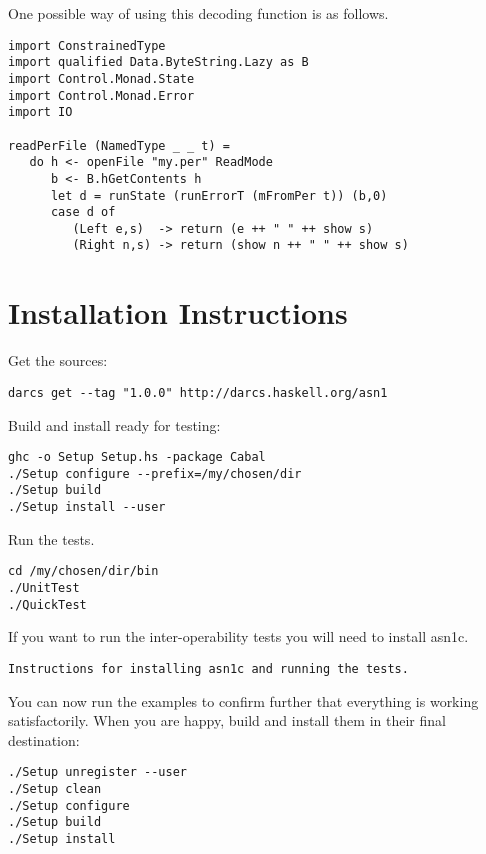\documentclass{article}
\begin{document}
One possible way of using this decoding function is as follows.

\begin{lstlisting}[frame=single]
import ConstrainedType
import qualified Data.ByteString.Lazy as B
import Control.Monad.State
import Control.Monad.Error
import IO

readPerFile (NamedType _ _ t) =
   do h <- openFile "my.per" ReadMode
      b <- B.hGetContents h
      let d = runState (runErrorT (mFromPer t)) (b,0)
      case d of
         (Left e,s)  -> return (e ++ " " ++ show s)
         (Right n,s) -> return (show n ++ " " ++ show s)
\end{lstlisting}

\section{Installation Instructions}

Get the sources:

\lstset{language=shell,basicstyle=\ttfamily\small}
\begin{lstlisting}[frame=single]
darcs get --tag "1.0.0" http://darcs.haskell.org/asn1
\end{lstlisting}

Build and install ready for testing:

\begin{lstlisting}[frame=single]
ghc -o Setup Setup.hs -package Cabal
./Setup configure --prefix=/my/chosen/dir
./Setup build
./Setup install --user
\end{lstlisting}

Run the tests.

\begin{lstlisting}[frame=single]
cd /my/chosen/dir/bin
./UnitTest
./QuickTest
\end{lstlisting}

If you want to run the inter-operability tests you will need to install asn1c.

\begin{lstlisting}[frame=single]
Instructions for installing asn1c and running the tests.
\end{lstlisting}

You can now run the examples to confirm further that everything
is working satisfactorily.
When you are happy, build and install them in
their final destination:

\begin{lstlisting}[frame=single]
./Setup unregister --user
./Setup clean
./Setup configure
./Setup build
./Setup install
\end{lstlisting}
\end{document}
